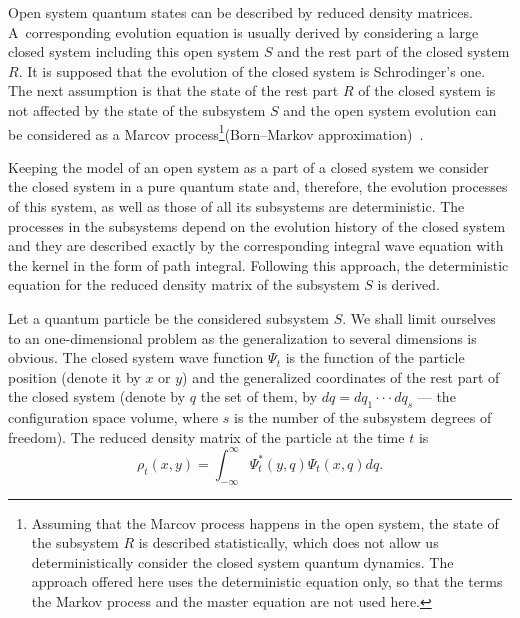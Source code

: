 Open system quantum states can be described by reduced density matrices. A~corresponding evolution equation is usually derived by considering a large closed system including this open system $S$ and the rest part of the closed system $R$. 
It is supposed that the evolution of the closed system is Schrodinger's one. 
The next assumption is that the state of the rest part $R$ of the closed system is not affected by the state of the subsystem $S$ and the open system evolution can be considered as a Marcov process\footnote{Assuming that the Marcov process happens in the open system, the state of the subsystem $R$ is described statistically, which does not allow us deterministically  consider the closed system quantum dynamics. The approach offered here uses the deterministic equation only, so that the terms the Markov process and the master equation are not used here.}(Born--Markov approximation)~\cite{bib:10,bib:11}.
	
Keeping the model of an open system as a part of a closed system we consider the closed system in a pure quantum state and, therefore, the evolution processes of this system, as well as those of all its subsystems are deterministic. The processes in the subsystems depend on the evolution history of the closed system and they are described exactly by the corresponding integral wave equation with the kernel in the form of path integral. Following this approach, the deterministic equation for the reduced density matrix of the subsystem $S$ is derived.
 
\smallskip 
 
Let a quantum particle be the considered subsystem $S$. We shall limit ourselves to an one-dimensional problem as the generalization to several dimensions is obvious. 
The closed system wave function $\Psi_t$ is the function of the particle position (denote it by $x$ or $y$) and the generalized coordinates of the rest part of the closed system (denote by $q$ the set of them, by $dq=dq_1\cdot\cdot\cdot dq_s$ --- the configuration space volume, where $s$ is the number of the subsystem degrees of freedom). 
The reduced density matrix of the particle at the time $t$ is
\begin{equation*} 
 \rho_t(x,y)=\int _{-\infty}^{\infty}\Psi_t^*(y,q)\Psi_t(x,q)dq.
\end{equation*}

